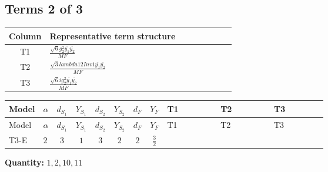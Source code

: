 \documentclass[8pt]{article}
\begin{document}
\begin{landscape}
\subsection*{Terms 2 of 3}
\begin{center}
\begin{tabular}{@{}c >{\raggedright\arraybackslash}p{0.82\linewidth}@{}}
\toprule
Column & Representative term structure \\
\midrule
T1 & \(\displaystyle \frac{\sqrt{6} g_{2}^{2} \overline{y_{1}} \overline{y_{2}}}{MF}\) \\
\midrule
T2 & \(\displaystyle \frac{\sqrt{3} lambda12Inv1 \overline{y_{1}} \overline{y_{2}}}{MF}\) \\
\midrule
T3 & \(\displaystyle \frac{\sqrt{6} i g_{2}^{2} \overline{y_{1}} \overline{y_{2}}}{MF}\) \\
\midrule
\bottomrule
\end{tabular}
\end{center}
\smallskip
\tiny
\begin{longtable}{@{}llcccccc >{\raggedright\arraybackslash}p{0.21\linewidth} >{\raggedright\arraybackslash}p{0.21\linewidth} >{\raggedright\arraybackslash}p{0.21\linewidth}@{}}
\toprule
Model & $\alpha$ & $d_{S_1}$ & $Y_{S_1}$ & $d_{S_2}$ & $Y_{S_2}$ & $d_F$ & $Y_F$ & T1 & T2 & T3 \\
\midrule
\endfirsthead
\toprule
Model & $\alpha$ & $d_{S_1}$ & $Y_{S_1}$ & $d_{S_2}$ & $Y_{S_2}$ & $d_F$ & $Y_F$ & T1 & T2 & T3 \\
\midrule
\endhead
T3-E & $2$ & $3$ & $1$ & $3$ & $2$ & $2$ & $\frac{3}{2}$ & \scriptsize\adjustbox{max width=\linewidth}{$\begin{gathered} - \frac{\sqrt{6} g_{2}^{2} \overline{y_{1}} \overline{y_{2}}}{6 MF}\end{gathered}$} & \scriptsize\adjustbox{max width=\linewidth}{$\begin{gathered} \frac{\sqrt{3} lambda12Inv1 \overline{y_{1}} \overline{y_{2}}}{6 MF}\end{gathered}$} & \scriptsize\adjustbox{max width=\linewidth}{$\begin{gathered} \frac{\sqrt{6} i g_{2}^{2} \overline{y_{1}} \overline{y_{2}}}{6 MF}\end{gathered}$} \\
\midrule
\bottomrule
\end{longtable}
\clearpage
\noindent\textbf{Quantity: }$\mathrm{1,2,10,11}$\par\smallskip

\end{landscape}
\end{document}
